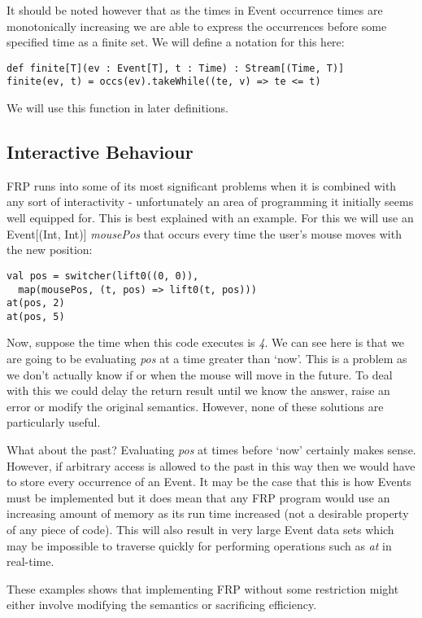       It should be noted however that as the times in Event occurrence times are monotonically increasing
      we are able to express the occurrences before some specified time as a finite set. We will
      define a notation for this here:

\begin{verbatim}
def finite[T](ev : Event[T], t : Time) : Stream[(Time, T)]
finite(ev, t) = occs(ev).takeWhile((te, v) => te <= t)
\end{verbatim}

      We will use this function in later definitions.
    
    \subsection{Interactive Behaviour}
      FRP runs into some of its most significant problems when it is combined with any
      sort of interactivity - unfortunately an area of programming it initially seems
      well equipped for. This is best explained with an example. For this we will use an 
      Event[(Int, Int)] \emph{mousePos} that occurs every time the user's mouse moves with the new position:

\begin{verbatim}
val pos = switcher(lift0((0, 0)), 
  map(mousePos, (t, pos) => lift0(t, pos)))
at(pos, 2)
at(pos, 5)
\end{verbatim}    

      Now, suppose the time when this code executes is \emph{4}. We can see here
      is that we are going to be evaluating \emph{pos} at a time greater than `now'. This is a problem as we don't
      actually know if or when the mouse will move in the future. To deal with this we could delay the return
      result until we know the answer, raise an error or modify the original semantics. However, none of these solutions are
      particularly useful.
      
      What about the past? Evaluating \emph{pos} at times before `now' certainly makes sense. However, if arbitrary
      access is allowed to the past in this way then we would have to store every occurrence
      of an Event. It may be the case that this is how Events must be implemented but it does
      mean that any FRP program would use an increasing amount of memory as its run time increased (not a 
      desirable property of any piece of code). This will also result in very large Event data sets which
      may be impossible to traverse quickly for performing operations such as \emph{at} in real-time.
      
      These examples shows that implementing FRP without some restriction might either involve modifying the
      semantics or sacrificing efficiency.